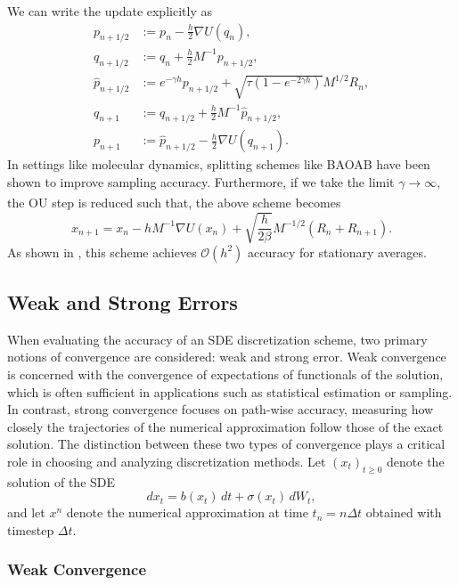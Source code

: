 \documentclass[11pt, twoside]{report}
\begin{document}
We can write the update explicitly as
$$
\begin{aligned}
p_{n+1 / 2} & :=p_n-\frac{h}{2} \nabla U\left(q_n\right), \\
q_{n+1 / 2} & :=q_n+\frac{h}{2} M^{-1} p_{n+1 / 2}, \\
\hat{p}_{n+1 / 2} & :=e^{-\gamma h} p_{n+1 / 2}+\sqrt{\tau\left(1-e^{-2\gamma h}\right)} M^{1 / 2} R_n, \\
q_{n+1} & :=q_{n+1 / 2}+\frac{h}{2} M^{-1} \hat{p}_{n+1 / 2}, \\
p_{n+1} & :=\hat{p}_{n+1 / 2}-\frac{h}{2} \nabla U\left(q_{n+1}\right) .
\end{aligned}
$$
In settings like molecular dynamics, splitting schemes like BAOAB have been shown to improve sampling accuracy. Furthermore, if we take the limit $\gamma \xrightarrow[]{} \infty$, the OU step is reduced such that, the above scheme becomes
\begin{equation} \label{eq:baoab_limit_scheme}
    x_{n+1}=x_n-h M^{-1} \nabla U\left(x_n\right)+\sqrt{\frac{h}{2\beta}} M^{-1 / 2}\left(R_n+R_{n+1}\right).
\end{equation}
As shown in \cite{leimkuhler2013rational}, this scheme achieves $\mathcal{O}(h^2)$ accuracy for stationary averages.

\subsection{Weak and Strong Errors}
When evaluating the accuracy of an SDE discretization scheme, two primary notions of convergence are considered: weak and strong error.
Weak convergence is concerned with the convergence of expectations of functionals of the solution, which is often sufficient in applications such as statistical estimation or sampling. In contrast, strong convergence focuses on path-wise accuracy, measuring how closely the trajectories of the numerical approximation follow those of the exact solution. The distinction between these two types of convergence plays a critical role in choosing and analyzing discretization methods. Let $(x_t)_{t\ge0}$ denote the solution of the SDE
\[
dx_t = b(x_t)\,dt + \sigma(x_t)\,dW_t,
\]
and let $x^n$ denote the numerical approximation at time $t_n = n\Delta t$ obtained with timestep $\Delta t$.

\subsubsection{Weak Convergence}
\end{document}
